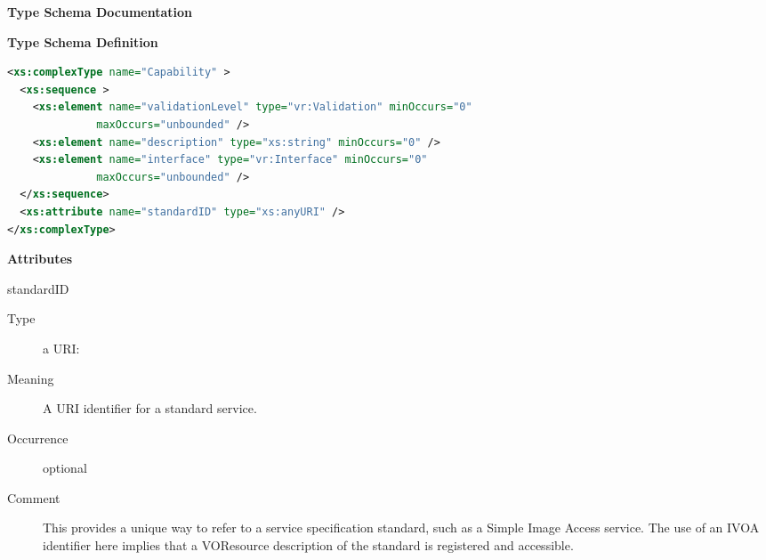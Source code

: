 \documentclass[11pt,a4paper]{ivoa}
\begin{document}
\begin{generated}
\begingroup
        \renewcommand*\descriptionlabel[1]{%
        \hbox to 5.5em{\emph{#1}\hfil}}\vspace{2ex}\noindent\textbf{ Type Schema Documentation}


\vspace{1ex}\noindent\textbf{ Type Schema Definition}

\begin{lstlisting}[language=XML,basicstyle=\footnotesize]
<xs:complexType name="Capability" >
  <xs:sequence >
    <xs:element name="validationLevel" type="vr:Validation" minOccurs="0"
              maxOccurs="unbounded" />
    <xs:element name="description" type="xs:string" minOccurs="0" />
    <xs:element name="interface" type="vr:Interface" minOccurs="0"
              maxOccurs="unbounded" />
  </xs:sequence>
  <xs:attribute name="standardID" type="xs:anyURI" />
</xs:complexType>
\end{lstlisting}

\vspace{0.5ex}\noindent\textbf{ Attributes}

\begingroup\small\begin{bigdescription}
\item[standardID]
\begin{description}
\item[Type] a URI: 
\item[Meaning]
               A URI identifier for a standard service.

\item[Occurrence] optional
\item[Comment]
               This provides a unique way to refer to a service
               specification standard, such as a Simple Image Access service.
               The use of an IVOA identifier here implies that a
               VOResource description of the standard is registered and
               accessible.

\end{description}


\end{bigdescription}\endgroup




\end{generated}
\end{document}
